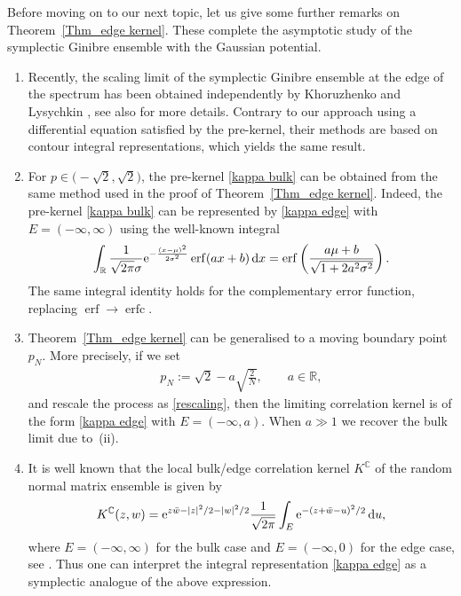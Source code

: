 \documentclass[pdftex]{sigma}
\numberwithin{equation}{section}
\newcommand{\erfc}{\operatorname{erfc}}
\newcommand{\erf}{\operatorname{erf}}
\newcommand{\R}{{\mathbb R}}
\newcommand{\C}{{\mathbb C}}
\newcommand{\1}{\chi}
\begin{document}
Before moving on to our next topic, let us give some further remarks on Theorem~\ref{Thm_edge kernel}. These complete the asymptotic study of the symplectic Ginibre ensemble with the Gaussian potential.

\begin{Remark}\samepage \quad
	\begin{enumerate}\itemsep=0pt
\item[(i)] Recently, the scaling limit of the symplectic Ginibre ensemble at the edge of the spectrum has been obtained independently by Khoruzhenko and Lysychkin \cite{BL2}, see also \cite{Lysychkin} for more details. Contrary to our approach using a differential equation satisfied by the pre-kernel, their methods are based on contour integral representations, which yields the same result.
	
\item[(ii)] %
		For $p \in \big({-}\sqrt{2},\sqrt{2}\big)$, the pre-kernel \eqref{kappa bulk} can be obtained from the same method used in the proof of Theorem~\ref{Thm_edge kernel}. Indeed, the pre-kernel \eqref{kappa bulk} can be represented by \eqref{kappa edge} with $E=(-\infty,\infty)$ using the well-known integral
		\begin{gather*}
			\int_{ \R } \frac{1}{\sqrt{2\pi} \sigma} {\rm e}^{ -\frac{(x-\mu)^2}{2\sigma^2} } \erf(ax+b) \, {\rm d}x=\erf\left( \frac{a\mu+b}{\sqrt{1+2a^2\sigma^2}} \right).
		\end{gather*}
		The same integral identity holds for the complementary error function, replacing $\erf\to\erfc$.
		
\item[(iii)] Theorem~\ref{Thm_edge kernel} can be generalised to a moving boundary point $p_N$. More precisely, if we set
		\begin{gather*}
			p_N:=\sqrt{2}-a\sqrt{ \frac{2}{N} } , \qquad a\in \R,
		\end{gather*}
		and rescale the process as \eqref{rescaling}, then the limiting correlation kernel is of the form \eqref{kappa edge} with $E=(-\infty,a).$ When $a \gg 1$ we recover the bulk limit due to~(ii).
		
\item[(iv)] It is well known that the local bulk/edge correlation kernel $K^\C$ of the random normal matrix ensemble is given by
		\begin{gather*}
		K^\C(z,w)={\rm e}^{z\bar{w}-|z|^2/2-|w|^2/2} \frac{1}{\sqrt{2\pi}} \int_{E} {\rm e}^{-(z+\bar{w}-u)^2/2 } \, {\rm d}u,
		\end{gather*}
		where $E=(-\infty,\infty)$ for the bulk case and $E=(-\infty,0)$ for the edge case, see \cite{MR2817648, hedenmalm2017planar}.
		Thus one can interpret the integral representation \eqref{kappa edge} as a symplectic analogue of the above expression.
		

\end{enumerate}
\end{Remark}
\end{document}
